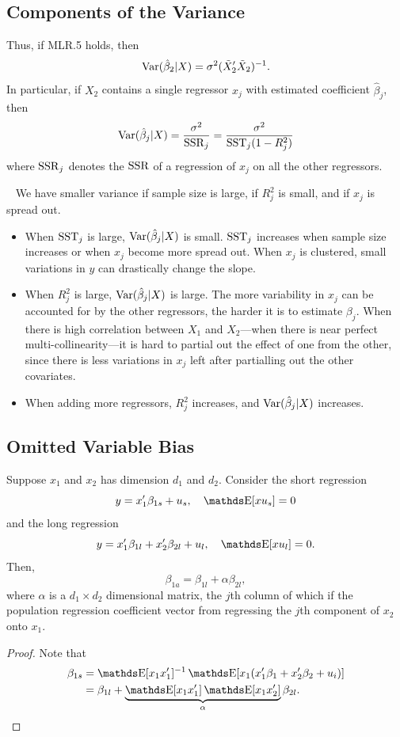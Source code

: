 \documentclass[letterpaper, 10pt]{article}
\begin{document}
\subsection{Components of the Variance}
Thus, if MLR.5 holds, then
\[
  \operatorname{Var}(\hat{\beta}_2 | X)
  = \sigma^2 (\tilde{X}_2' \tilde{X}_2)^{-1}.
\]
In particular, if \(X_2\) contains a single regressor \(x_j\) with estimated coefficient \(\hat{\beta}_j\), then
\[
  \operatorname{Var}(\hat{\beta}_j | X)
  = \frac{\sigma^2}{\operatorname{SSR}_j}
  = \frac{\sigma^2}{\operatorname{SST}_j(1 - R^2_j)}
\]
where \(\operatorname{SSR}_j\) denotes the \(\operatorname{SSR}\) of a regression of \(x_j\) on all the other regressors.
\begin{remark}~
  We have smaller variance if sample size is large, if \(R_j^2\) is small, and if \(x_j\) is spread out.
  \begin{itemize}
    \item When \(\operatorname{SST}_j\) is large, \(\operatorname{Var}(\hat{\beta}_j | X)\) is small.
      \(\operatorname{SST}_j\) increases when sample size increases or when \(x_j\) become more spread out.
      When \(x_j\) is clustered, small variations in \(y\) can drastically change the slope.
    \item When \(R_j^2\) is large, \(\operatorname{Var}(\hat{\beta}_j | X)\) is large.
      The more variability in \(x_j\) can be accounted for by the other regressors, the harder it is to estimate \(\beta_j\).
      When there is high correlation between \(X_1\) and \(X_2\)---when there is near perfect multi-collinearity---it is hard to partial out the effect of one from the other, since there is less variations in \(x_j\) left after partialling out the other covariates.
    \item When adding more regressors, \(R_j^2\) increases, and \(\operatorname{Var}(\hat{\beta}_j | X)\) increases.
  \end{itemize}
\end{remark}


\subsection{Omitted Variable Bias}
\begin{proposition}
  Suppose \(x_{1}\) and \(x_{2}\) has dimension \(d_1\) and \(d_2\).
  Consider the short regression
  \[
    y = x_{1}' \beta_{1 s} + u_s, \quad \E[xu_s] = 0
  \]
  and the long regression
  \[
    y = x_{1}' \beta_{1 l} + x_{2}' \beta_{2 l} + u_l, \quad \E[xu_l] = 0.
  \]
  Then,
  \[
    \beta_{1 a} = \beta_{1 l} + \alpha \beta_{2 l},
  \]
  where \(\alpha\) is a \(d_1 \times d_2\) dimensional matrix, the \(j\)th column of which if the population regression coefficient vector from regressing the \(j\)th component of \(x_{2}\) onto \(x_{1}\).
\end{proposition}
\begin{proof}
  Note that
  \begin{align*}
    \beta_{1 s}
    &= \E[x_{1} x_{1}']^{-1} \E[x_{1} (x_{1}' \beta_{1} + x_{2}' \beta_{2} + u_i)] \\
    &= \beta_{1 l} + \underbrace{\E[x_1 x_1'] \E[x_1 x_2']}_{\alpha} \beta_{2l}.
  \end{align*}
\end{proof}
\end{document}
